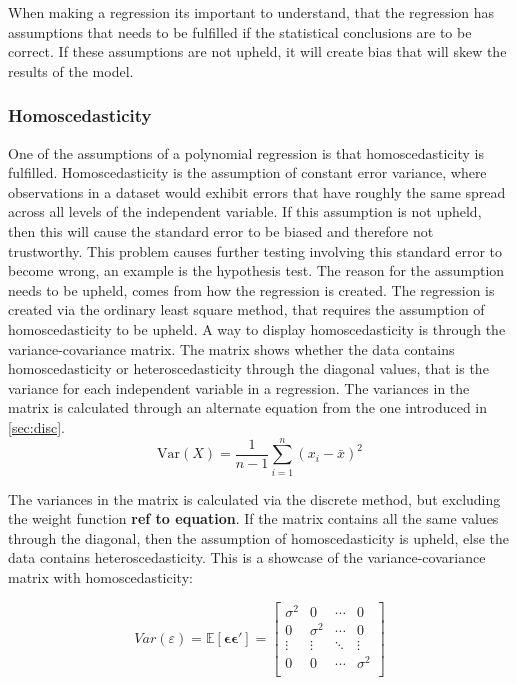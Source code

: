 When making a regression its important to understand, that the regression has assumptions that needs to be fulfilled if the statistical conclusions are to be correct. If these assumptions are not upheld, it will create bias that will skew the results of the model.
\subsubsection{Homoscedasticity}
One of the assumptions of a polynomial regression is that homoscedasticity is fulfilled. Homoscedasticity is the assumption of constant error variance, where observations in a dataset would exhibit errors that have roughly the same spread across all levels of the independent variable.
\newline
If this assumption is not upheld, then this will cause the standard error to be biased and therefore not trustworthy. This problem causes further testing involving this standard error to become wrong, an example is the hypothesis test.
\newline
The reason for the assumption needs to be upheld, comes from how the regression is created. The regression is created via the ordinary least square method, that requires the assumption of homoscedasticity to be upheld.
\newline
A way to display homoscedasticity is through the variance-covariance matrix. The matrix shows whether the data contains homoscedasticity or heteroscedasticity through the diagonal values, that is the variance for each independent variable in a regression. The variances in the matrix is calculated through an alternate equation from the one introduced in \autoref{sec:disc}.
\begin{equation}
	\text{Var}(X) = \frac{1}{n - 1} \sum_{i=1}^{n} (x_i - \bar{x})^2
\end{equation}

The variances in the matrix is calculated via the discrete method, but excluding the weight function \textbf{ref to equation}. If the matrix contains all the same values through the diagonal, then the assumption of homoscedasticity is upheld, else the data contains heteroscedasticity. This is a showcase of the variance-covariance matrix with homoscedasticity:


	
\[ 
Var(\varepsilon) = \mathbb{E}[\boldsymbol{\epsilon} \boldsymbol{\epsilon}'] = 
\left[
\begin{array}{cccc}
	\sigma^2 & 0        & \cdots & 0 \\
	0        & \sigma^2 & \cdots & 0 \\
	\vdots   & \vdots   & \ddots & \vdots \\
	0        & 0        & \cdots & \sigma^2 \\
\end{array}
\right]
\]


